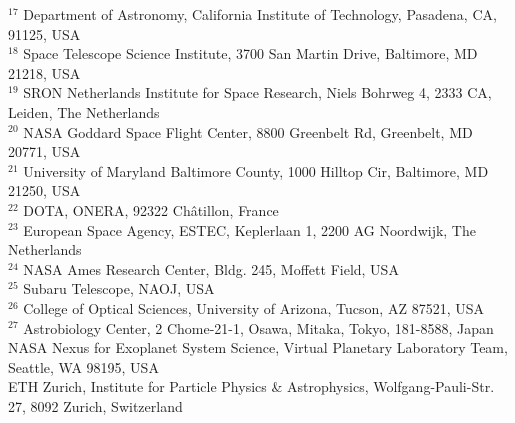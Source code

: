 \documentclass[
    usenatbib,
]{mnras}
\makeatletter
\newcommand{\affiliationtarget}[1]{\Hy@raisedlink{\hypertarget{#1}{}}}
\makeatother
\begin{document}
$^{17}$ Department of Astronomy, California Institute of Technology, Pasadena, CA, 91125, USA \\
$^{18}$ Space Telescope Science Institute, 3700 San Martin Drive, Baltimore, MD 21218, USA \\
$^{19}$ SRON Netherlands Institute for Space Research, Niels Bohrweg 4, 2333 CA, Leiden, The Netherlands \\
$^{20}$ NASA Goddard Space Flight Center, 8800 Greenbelt Rd, Greenbelt, MD  20771, USA \\
$^{21}$ University of Maryland Baltimore County, 1000 Hilltop Cir, Baltimore, MD 21250, USA \\
$^{22}$ DOTA, ONERA, 92322 Châtillon, France \\
$^{23}$ European Space Agency, ESTEC, Keplerlaan 1, 2200 AG Noordwijk, The Netherlands \\
$^{24}$ NASA Ames Research Center, Bldg. 245, Moffett Field, USA \\
$^{25}$ Subaru Telescope, NAOJ, USA \\
$^{26}$ College of Optical Sciences, University of Arizona, Tucson, AZ 87521, USA \\
$^{27}$ Astrobiology Center, 2 Chome-21-1, Osawa, Mitaka, Tokyo, 181-8588, Japan \\
\affiliationtarget{28}{$^{28}$} NASA Nexus for Exoplanet System Science, Virtual Planetary Laboratory Team, Seattle, WA 98195, USA \\
\affiliationtarget{29}{$^{29}$} ETH Zurich, Institute for Particle Physics \& Astrophysics, Wolfgang-Pauli-Str. 27, 8092 Zurich, Switzerland
\endgroup
\end{document}
